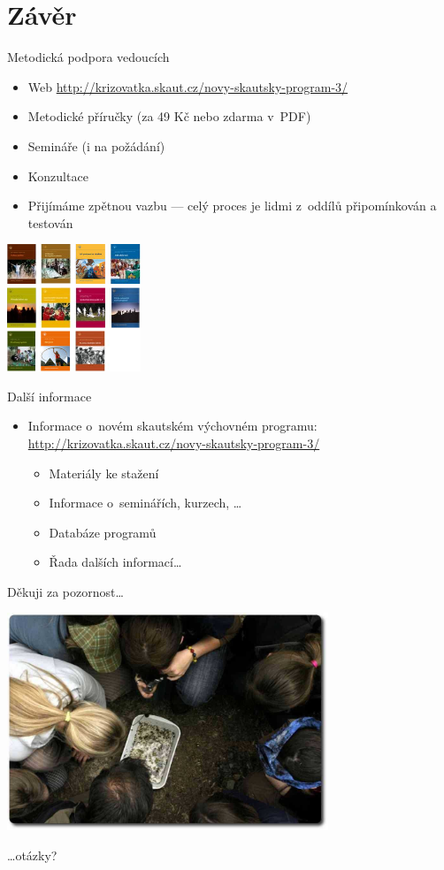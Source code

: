 \documentclass[compress,xelatex,xcolor=dvipsnames,hyperref={pdfpagelabels=false},print]{beamer}
\begin{document}
\section{Závěr}

\begin{frame}{Metodická podpora vedoucích}
\begin{itemize}
\item Web \href{http://krizovatka.skaut.cz/novy-skautsky-program-3/}{http://krizovatka.skaut.cz/novy-skautsky-program-3/}
\item Metodické příručky (za 49 Kč nebo zdarma v~PDF)
\item Semináře (i na  požádání)
\item Konzultace
\item Přijímáme zpětnou vazbu --- celý proces je lidmi z~oddílů připomínkován a testován
\end{itemize}
\begin{center}
\includegraphics[width=4cm]{prirucky.png}
\end{center}
\end{frame}

\begin{frame}{Další informace}
\begin{itemize}
\item Informace o~novém skautském výchovném programu: \href{http://krizovatka.skaut.cz/novy-skautsky-program-3/}{http://krizovatka.skaut.cz/novy-skautsky-program-3/}
 \begin{itemize}
 \item Materiály ke stažení
 \item Informace o~seminářích, kurzech, \ldots
 \item Databáze programů
 \item Řada dalších informací\ldots
 \end{itemize}
\end{itemize}
\end{frame}

\begin{frame}{Děkuji za pozornost\ldots}
\begin{center}
\includegraphics[height=6.5cm]{zaver.jpg}
\end{center}
\begin{flushright}
\ldots otázky?
\end{flushright}
\end{frame}
\end{document}
